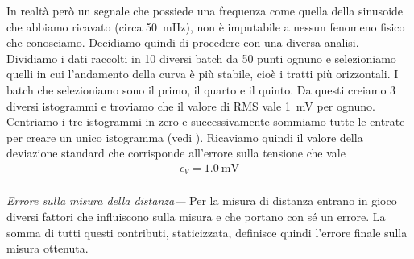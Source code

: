 \documentclass[
    rmp,
    reprint, 
    superscriptaddress, 
    altaffilletter, 
    amsmath, 
    amssymb,
    a4paper]{revtex4-2}
\begin{document}
In realtà però un segnale che possiede una frequenza come quella della sinusoide che abbiamo ricavato (circa \SI{50}{\milli\hertz}), non è imputabile a nessun fenomeno fisico che conosciamo. Decidiamo quindi di procedere con una diversa analisi. Dividiamo i dati raccolti in 10 diversi batch da 50 punti ognuno e selezioniamo quelli in cui l'andamento della curva è più stabile, cioè i tratti più orizzontali. I batch che selezioniamo sono il primo, il quarto e il quinto. Da questi creiamo 3 diversi istogrammi e troviamo che il valore di RMS vale \SI{1}{\milli\volt} per ognuno. Centriamo i tre istogrammi in zero e successivamente sommiamo tutte le entrate per creare un unico istogramma (vedi ). Ricaviamo quindi il valore della deviazione standard che corrisponde all'errore sulla tensione che vale
\begin{align*}
    \epsilon_{V} = \SI{1.0}{\milli\volt}\\ 
\end{align*}


\noindent\textit{Errore sulla misura della distanza---}
Per la misura di distanza entrano in gioco diversi fattori che influiscono sulla misura e che portano con sé un errore. La somma di tutti questi contributi, staticizzata, definisce quindi l'errore finale sulla misura ottenuta. 
\end{document}
